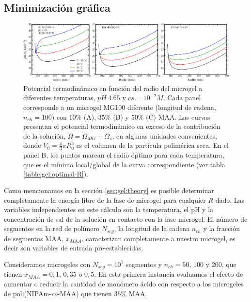 \subsection{Minimizaci\'on gr\'afica}\label{sec:gel:minimi}

\begin{figure}[!htb]
\centering
\includegraphics[width=1.\linewidth]{Figures/graph-gel/graph-min.pdf}
\caption{Potencial termodin\'amico en funci\'on del radio del microgel a diferentes temperaturas, $pH~4.65$ y $cs=10^{-2}M$.
	Cada panel corresponde a un microgel MG100 diferente (longitud de cadena, $n_{ch}=100$) con $10\%$ (A), $35\%$ (B) y $50\%$ (C) MAA.
	Las curvas presentan el potencial termodin\'amico en exceso de la contribuci\'on de la soluci\'on, $\Omega=\Omega_{MG}-\Omega_s$, en algunas unidades convenientes, donde $V_0=\frac{4}{3}\pi R_0^3$ es el volumen de la part\'icula polim\'erica seca.
	En el panel B, los puntos  marcan el radio \'optimo para cada temperatura, que es el m\'inimo local/global de la curva correspondiente (ver tabla \ref{table:gel:optimal-R}).}
\label{fig:gel:graph-min}
\end{figure}

Como mencionamos en la secci\'on \ref{sec:gel:theory} es posible determinar completamente la energ\'ia libre de la fase de microgel para cualquier $R$ dado.
Las variables independientes en este c\'alculo son la temperatura, el pH y la concentraci\'on de sal de la soluci\'on en contacto con la fase microgel.
El n\'umero de segmentos en la red de pol\'imero $N_{seg}$, la longitud de la cadena $n_{ch}$ y la fracci\'on de segmentos MAA, $x_{MAA}$, caracterizan completamente a nuestro microgel, es decir son variables de entrada pre-establecidas.


Consideramos microgeles con $N_{seg}=10^7$ segmentos y $n_{ch}=50$, $100$ y $200$, que tienen $x_{MAA}=0,1$, $0,35$ o $0,5$.
En esta primera instancia evaluamos el efecto de aumentar o reducir la cantidad de mon\'omero \'acido con respecto a los microgeles de poli(NIPAm-\emph{co}-MAA) que tienen $35\%$ MAA.

